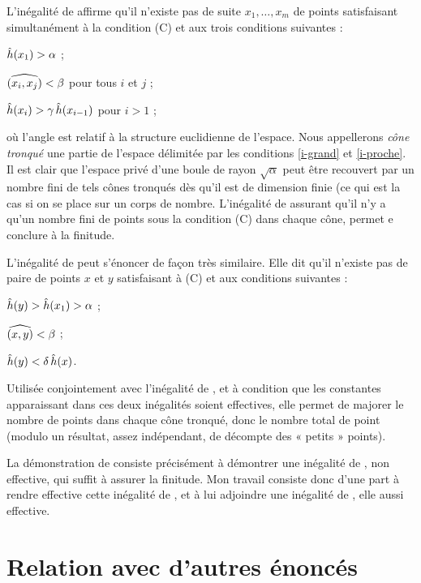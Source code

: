\documentclass{mpg-preth}
\begin{document}
L'inégalité de  affirme qu'il n'existe pas de suite $x_1, \dots,
x_m$ de points satisfaisant simultanément à la condition (C) et aux trois
conditions suivantes :
\begin{enumthm}
  \item $\mathop{\smash{\hat h}}(x_1) > \alpha$ ; \label{i-grand}
  \item $\widehat{(x_i,x_j)} < \beta$ pour tous $i$ et $j$ ; \label{i-proche}
  \item $\mathop{\smash{\hat h}}(x_i) > \gamma \mathop{\smash{\hat h}}(x_{i-1})$ pour $i > 1$ ;
\end{enumthm}
où l'angle est relatif à la structure euclidienne de l'espace. Nous
appellerons \emph{cône tronqué} une partie de l'espace délimitée par les
conditions \ref{i-grand} et \ref{i-proche}. Il est clair que l'espace privé
d'une boule de rayon $\sqrt{\alpha}$ peut être recouvert par un nombre fini de
tels cônes tronqués dès qu'il est de dimension finie (ce qui est la cas si on
se place sur un corps de nombre. L'inégalité de  assurant qu'il n'y
a qu'un nombre fini de points sous la condition (C) dans chaque cône, permet e
conclure à la finitude.

L'inégalité de  peut s'énoncer de façon très similaire. Elle dit
qu'il n'existe pas de paire de points $x$ et $y$ satisfaisant à (C) et aux
conditions suivantes :
\begin{enumthm}
  \item $\mathop{\smash{\hat h}}(y) > \mathop{\smash{\hat h}}(x_1) > \alpha$ ;
  \item $\widehat{(x,y)} < \beta$ ;
  \item $\mathop{\smash{\hat h}}(y) < \delta \mathop{\smash{\hat h}}(x)$.
\end{enumthm}
Utilisée conjointement avec l'inégalité de , et à condition que les
constantes apparaissant dans ces deux inégalités soient effectives, elle
permet de majorer le nombre de points dans chaque cône tronqué, donc le nombre
total de point (modulo un résultat, assez indépendant, de décompte des «
petits » points).

La démonstration de  consiste précisément à démontrer une
inégalité de , non effective, qui suffit à assurer la finitude. Mon
travail consiste donc d'une part à rendre effective cette inégalité de
, et à lui adjoindre une inégalité de , elle aussi
effective.

\ifdefined\publicversion \clearpage \fi
\section{Relation avec d'autres énoncés}
\end{document}
